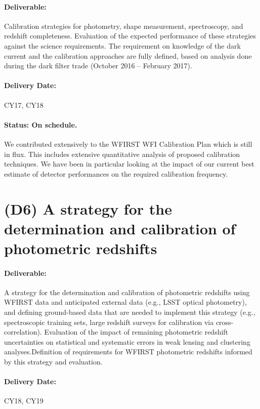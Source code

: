 \paragraph*{Deliverable:} Calibration strategies for photometry, shape
measurement, spectroscopy, and redshift completeness. Evaluation of the expected
performance of these strategies against the science requirements. The
requirement on knowledge of the dark current and the calibration approaches are
fully defined, based on analysis done during the dark filter trade (October 2016
-- February 2017).

\paragraph*{Delivery Date:} CY17, CY18

\paragraph*{Status: On schedule.} We contributed extensively to the WFIRST WFI Calibration Plan which is still in flux. This includes extensive quantitative analysis of proposed calibration techniques. We have been in particular looking at the impact of our current best estimate of detector performances on the required calibration frequency.


\section*{(D6) A strategy for the determination and calibration of photometric redshifts}

\paragraph*{Deliverable:} A strategy for the determination and calibration of
photometric redshifts using WFIRST data and anticipated external data (e.g.,
LSST optical photometry), and defining ground-based data that are needed to
implement this strategy (e.g., spectroscopic training sets, large redshift
surveys for calibration via cross-correlation). Evaluation of the impact of
remaining photometric redshift uncertainties on statistical and systematic
errors in weak lensing and clustering analyses.Definition of requirements for
WFIRST photometric redshifts informed by this strategy and evaluation.

\paragraph*{Delivery Date:} CY18, CY19

